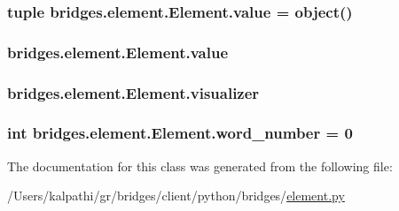 \subsubsection[{value}]{\setlength{\rightskip}{0pt plus 5cm}tuple bridges.\+element.\+Element.\+value = object()\hspace{0.3cm}{\ttfamily [static]}}\label{classbridges_1_1element_1_1_element_a4ea3c6d8ba6395dc681e337074f098aa}
\hypertarget{classbridges_1_1element_1_1_element_ab0f332022d1ded0b9cd2989bc7a22765}{}
\subsubsection[{value}]{\setlength{\rightskip}{0pt plus 5cm}bridges.\+element.\+Element.\+value}\label{classbridges_1_1element_1_1_element_ab0f332022d1ded0b9cd2989bc7a22765}
\hypertarget{classbridges_1_1element_1_1_element_a86b560e1c213852ad2e99131f0f1e914}{}
\subsubsection[{visualizer}]{\setlength{\rightskip}{0pt plus 5cm}bridges.\+element.\+Element.\+visualizer}\label{classbridges_1_1element_1_1_element_a86b560e1c213852ad2e99131f0f1e914}
\hypertarget{classbridges_1_1element_1_1_element_acd203dd3944abb6407aa37957b5f07ce}{}
\subsubsection[{word\+\_\+number}]{\setlength{\rightskip}{0pt plus 5cm}int bridges.\+element.\+Element.\+word\+\_\+number = 0\hspace{0.3cm}{\ttfamily [static]}}\label{classbridges_1_1element_1_1_element_acd203dd3944abb6407aa37957b5f07ce}


The documentation for this class was generated from the following file\+:\begin{DoxyCompactItemize}
\item 
/\+Users/kalpathi/gr/bridges/client/python/bridges/\hyperlink{element_8py}{element.\+py}\end{DoxyCompactItemize}
